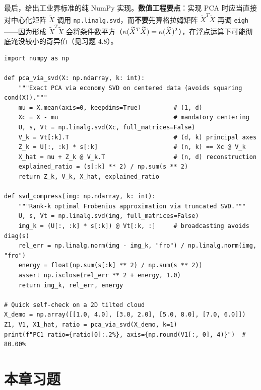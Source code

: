 最后，给出工业界标准的纯 NumPy 实现。\textbf{数值工程要点}：实现 PCA 时应当直接对中心化矩阵 $\widetilde{X}$ 调用 \texttt{np.linalg.svd}，而\textbf{不要}先算格拉姆矩阵 $\widetilde{X}^T\widetilde{X}$ 再调 \texttt{eigh}——因为形成 $\widetilde{X}^T\widetilde{X}$ 会将条件数平方（$\kappa(\widetilde{X}^T\widetilde{X}) = \kappa(\widetilde{X})^2$），在浮点运算下可能彻底淹没较小的奇异值（见习题 4.8）。

\begin{lstlisting}[caption={工业级 \texttt{pca\_via\_svd} 与 \texttt{svd\_compress} 纯 NumPy 实现},label={lst:ch4-pca-svd}]
import numpy as np

def pca_via_svd(X: np.ndarray, k: int):
    """Exact PCA via economy SVD on centered data (avoids squaring cond(X))."""
    mu = X.mean(axis=0, keepdims=True)         # (1, d)
    Xc = X - mu                                # mandatory centering
    U, s, Vt = np.linalg.svd(Xc, full_matrices=False)
    V_k = Vt[:k].T                             # (d, k) principal axes
    Z_k = U[:, :k] * s[:k]                     # (n, k) == Xc @ V_k
    X_hat = mu + Z_k @ V_k.T                   # (n, d) reconstruction
    explained_ratio = (s[:k] ** 2) / np.sum(s ** 2)
    return Z_k, V_k, X_hat, explained_ratio

def svd_compress(img: np.ndarray, k: int):
    """Rank-k optimal Frobenius approximation via truncated SVD."""
    U, s, Vt = np.linalg.svd(img, full_matrices=False)
    img_k = (U[:, :k] * s[:k]) @ Vt[:k, :]     # broadcasting avoids diag(s)
    rel_err = np.linalg.norm(img - img_k, "fro") / np.linalg.norm(img, "fro")
    energy = float(np.sum(s[:k] ** 2) / np.sum(s ** 2))
    assert np.isclose(rel_err ** 2 + energy, 1.0)
    return img_k, rel_err, energy

# Quick self-check on a 2D tilted cloud
X_demo = np.array([[1.0, 4.0], [3.0, 2.0], [5.0, 8.0], [7.0, 6.0]])
Z1, V1, X1_hat, ratio = pca_via_svd(X_demo, k=1)
print(f"PC1 ratio={ratio[0]:.2%}, axis={np.round(V1[:, 0], 4)}")  # 80.00%
\end{lstlisting}

\section{本章习题}
\label{sec:ch4-exercises}


